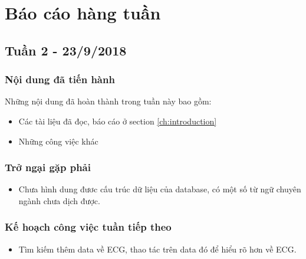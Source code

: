 \chapter*{Báo cáo hàng tuần}
\section{Tuần 2 - 23/9/2018}
\subsection{Nội dung đã tiến hành}
Những nội dung đã hoàn thành trong tuần này bao gồm:
\begin{itemize}
\item Các tài liệu đã đọc, báo cáo ở section \ref{ch:introduction}
\item Những công việc khác
\end{itemize}

\subsection{Trở ngại gặp phải}
\begin{itemize}
    \item Chưa hình dung đươc cấu trúc dữ liệu của database, có một số  từ ngữ chuyên ngành chưa dịch được.
\end{itemize}

\subsection{Kế hoạch công việc tuần tiếp theo}
\begin{itemize}
    \item Tìm kiếm thêm data về ECG, thao tác trên data đó để  hiểu rõ hơn về ECG.
\end{itemize}
